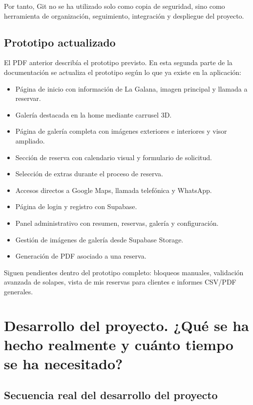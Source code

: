 \documentclass[11pt,a4paper]{article}
\begin{document}
Por tanto, Git no se ha utilizado solo como copia de seguridad, sino como herramienta de organización, seguimiento, integración y despliegue del proyecto.

\subsection{Prototipo actualizado}
El PDF anterior describía el prototipo previsto. En esta segunda parte de la documentación se actualiza el prototipo según lo que ya existe en la aplicación:
\begin{itemize}[leftmargin=1.4cm]
  \item Página de inicio con información de La Galana, imagen principal y llamada a reservar.
  \item Galería destacada en la home mediante carrusel 3D.
  \item Página de galería completa con imágenes exteriores e interiores y visor ampliado.
  \item Sección de reserva con calendario visual y formulario de solicitud.
  \item Selección de extras durante el proceso de reserva.
  \item Accesos directos a Google Maps, llamada telefónica y WhatsApp.
  \item Página de login y registro con Supabase.
  \item Panel administrativo con resumen, reservas, galería y configuración.
  \item Gestión de imágenes de galería desde Supabase Storage.
  \item Generación de PDF asociado a una reserva.
\end{itemize}

Siguen pendientes dentro del prototipo completo: bloqueos manuales, validación avanzada de solapes, vista de mis reservas para clientes e informes CSV/PDF generales.

\section{Desarrollo del proyecto. ¿Qué se ha hecho realmente y cuánto tiempo se ha necesitado?}

\subsection{Secuencia real del desarrollo del proyecto}
\end{document}
